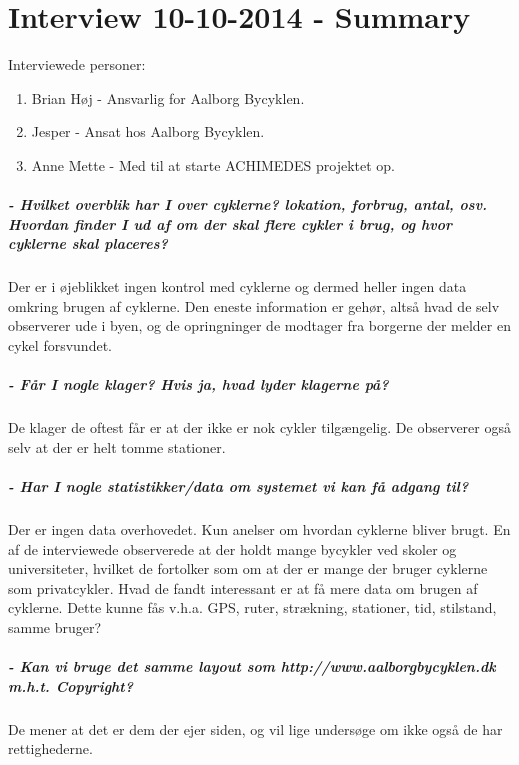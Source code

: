 \chapter{Interview 10-10-2014 - Summary}\label{interviewReferat}
Interviewede personer:
\begin{enumerate}
\item Brian Høj - Ansvarlig for Aalborg Bycyklen.
\item Jesper - Ansat hos Aalborg Bycyklen.
\item Anne Mette - Med til at starte ACHIMEDES projektet op.
\end{enumerate}

\paragraph{- Hvilket overblik har I over cyklerne? lokation, forbrug, antal, osv. Hvordan finder I ud af om der skal flere cykler i brug, og hvor cyklerne skal placeres?}
Der er i øjeblikket ingen kontrol med cyklerne og dermed heller ingen  data omkring brugen
af cyklerne. Den eneste information er gehør, altså hvad de selv observerer ude i byen,
og de opringninger de modtager fra borgerne der melder en cykel forsvundet.

\paragraph{- Får I nogle klager? Hvis ja, hvad lyder klagerne på?}
De klager de oftest får er at der ikke er nok cykler tilgængelig. De observerer også selv
at der er helt tomme stationer.

\paragraph{- Har I nogle statistikker/data om systemet vi kan få adgang til?}
Der er ingen data overhovedet. Kun anelser om hvordan cyklerne bliver brugt. En af de interviewede
observerede at der holdt mange bycykler ved skoler og universiteter, hvilket de fortolker som om
at der er mange der bruger cyklerne som privatcykler.
Hvad de fandt interessant er at få mere data om brugen af cyklerne. Dette kunne fås v.h.a. GPS, ruter, strækning, stationer, tid, 
stilstand, samme bruger?

\paragraph{- Kan vi bruge det samme layout som http://www.aalborgbycyklen.dk m.h.t. Copyright?}
De mener at det er dem der ejer siden, og vil lige undersøge om ikke også de har rettighederne.

